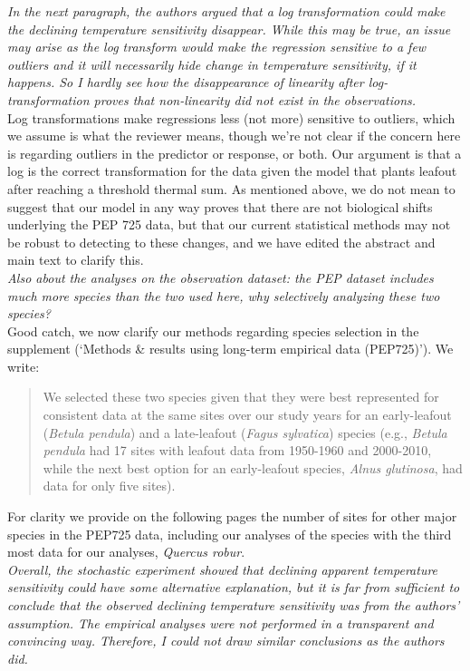 \documentclass[11pt,letter]{article}
\begin{document}
\emph{In the next paragraph, the authors argued that a log transformation could make the declining temperature sensitivity disappear. While this may be true, an issue may arise as the log transform would make the regression sensitive to a few outliers and it will necessarily hide change in temperature sensitivity, if it happens. So I hardly see how the disappearance of linearity after log-transformation proves that non-linearity did not exist in the observations.}\\

Log transformations make regressions less (not more) sensitive to outliers, which we assume is what the reviewer means, though we're not clear if the concern here is regarding outliers in the predictor or response, or both. Our argument is that a log is the correct transformation for the data given the model that plants leafout after reaching a threshold thermal sum. As mentioned above, we do not mean to suggest that our model in any way proves that there are not biological shifts underlying the PEP 725 data, but that our current statistical methods may not be robust to detecting to these changes, and we have edited the abstract and main text to clarify this. \\

\emph{Also about the analyses on the observation dataset: the PEP dataset includes much more species than the two used here, why selectively analyzing these two species?}\\

Good catch, we now clarify our methods regarding species selection in the supplement (`Methods \& results using long-term empirical data (PEP725)'). We write:
\begin{quote}
 We selected these two species given that they were best represented for consistent data at the same sites over our study years for an early-leafout (\emph{Betula pendula}) and a late-leafout (\emph{Fagus sylvatica}) species (e.g., \emph{Betula pendula} had 17 sites with leafout data from 1950-1960 and 2000-2010, while the next best option for an early-leafout species, \emph{Alnus glutinosa}, had data for only five sites). 
\end{quote}
For clarity we provide on the following pages the number of sites for other major species in the PEP725 data, including our analyses of the species with the third most data for our analyses, \emph{Quercus robur}.\\

\emph{Overall, the stochastic experiment showed that declining apparent temperature sensitivity could have some alternative explanation, but it is far from sufficient to conclude that the observed declining temperature sensitivity was from the authors' assumption. The empirical analyses were not performed in a transparent and convincing way. Therefore, I could not draw similar conclusions as the authors did.}\\
\end{document}
